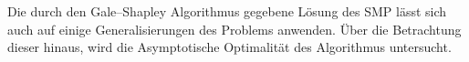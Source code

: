 Die durch den Gale–Shapley Algorithmus\cite{Gale:1962} gegebene Lösung des SMP lässt sich auch auf einige Generalisierungen des Problems anwenden. Über die Betrachtung dieser hinaus, wird die Asymptotische Optimalität des Algorithmus untersucht.
